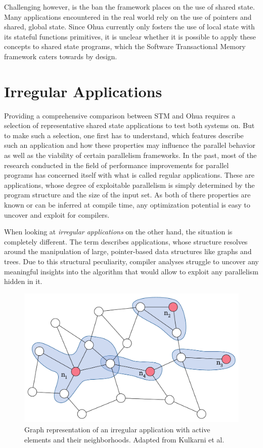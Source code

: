 Challenging however, is the ban the framework places on the use of shared state.
Many applications encountered in the real world rely on the use of pointers and shared, global state.
Since Ohua currently only fosters the use of local state with its stateful functions primitives, it is unclear whether it is possible to apply these concepts to shared state programs, which the Software Transactional Memory framework caters towards by design.


\section{Irregular Applications}
\label{sec:background:irregular}

Providing a comprehensive comparison between STM and Ohua requires a selection of representative shared state applications to test both systems on.
But to make such a selection, one first has to understand, which features describe such an application and how these properties may influence the parallel behavior as well as the viability of certain parallelism frameworks.
In the past, most of the research conducted in the field of performance improvements for parallel programs has concerned itself with what is called regular applications.
These are applications, whose degree of exploitable parallelism is simply determined by the program structure and the size of the input set.
As both of there properties are known or can be inferred at compile time, any optimization potential is easy to uncover and exploit for compilers.

When looking at \emph{irregular applications} on the other hand, the situation is completely different.
The term describes applications, whose structure resolves around the manipulation of large, pointer-based data structures like graphs and trees.
Due to this structural peculiarity, compiler analyses struggle to uncover any meaningful insights into the algorithm that would allow to exploit any parallelism hidden in it.

\begin{figure}[b]
    \centering
    \includegraphics[width=.7\textwidth,keepaspectratio]{gfx/background-irregular}
    \caption{Graph representation of an irregular application with active elements and their neighborhoods. Adapted from Kulkarni et al.~\cite{kulkarni2009much}}%
    \label{fig:background:irregular}
\end{figure}

